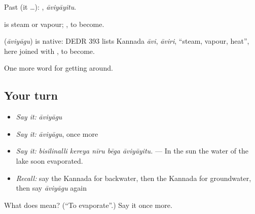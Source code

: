 Past (it …): , \emph{āviyāyitu}.

 is steam or vapour; , to become.

\begin{cousinweb}
\textbf{} (\emph{āviyāgu}) is native: DEDR 393 lists Kannada \emph{āvi}, \emph{āviri}, \textquotedblleft{}steam, vapour, heat\textquotedblright{}, here joined with , to become.
\end{cousinweb}

\begin{grammarlens}[title={What you've built}]
One more word for getting around.
\end{grammarlens}

\subsection*{Your turn}
\begin{itemize}
\raggedright
  \item \emph{Say it:} \emph{āviyāgu}
  \item \emph{Say it:} \emph{āviyāgu}, once more
  \item \emph{Say it:} \emph{bisilinalli kereya nīru bēga āviyāyitu.} — In the sun the water of the lake soon evaporated.
  \item \emph{Recall:} say the Kannada for backwater, then the Kannada for groundwater, then say \emph{āviyāgu} again
\end{itemize}

\begin{tcolorbox}[breakable,colback=teal!4,colframe=teal!35!black,title={Before you move on}]
What does  mean? (\textquotedblleft{}To evaporate\textquotedblright{}.) Say it once more.
\end{tcolorbox}
